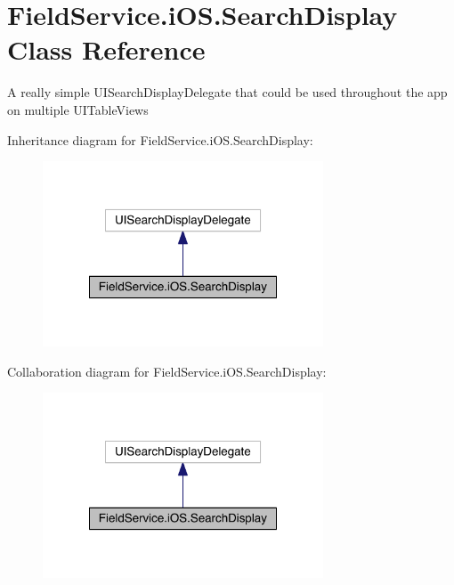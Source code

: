 \hypertarget{class_field_service_1_1i_o_s_1_1_search_display}{\section{Field\+Service.\+i\+O\+S.\+Search\+Display Class Reference}
\label{class_field_service_1_1i_o_s_1_1_search_display}
}


A really simple U\+I\+Search\+Display\+Delegate that could be used throughout the app on multiple U\+I\+Table\+Views  




Inheritance diagram for Field\+Service.\+i\+O\+S.\+Search\+Display\+:
\nopagebreak
\begin{figure}[H]
\begin{center}
\leavevmode
\includegraphics[width=236pt]{class_field_service_1_1i_o_s_1_1_search_display__inherit__graph}
\end{center}
\end{figure}


Collaboration diagram for Field\+Service.\+i\+O\+S.\+Search\+Display\+:
\nopagebreak
\begin{figure}[H]
\begin{center}
\leavevmode
\includegraphics[width=236pt]{class_field_service_1_1i_o_s_1_1_search_display__coll__graph}
\end{center}
\end{figure}
